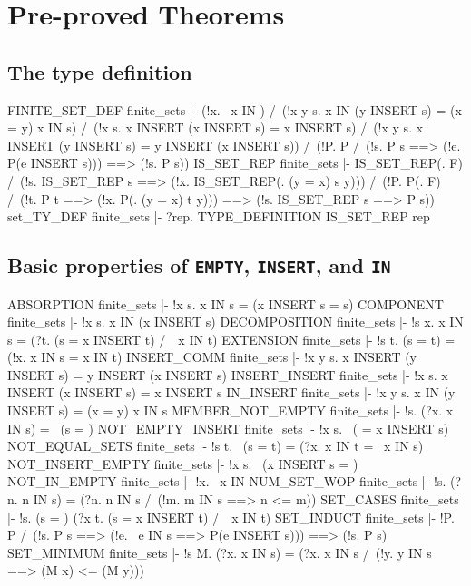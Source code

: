 \chapter{Pre-proved Theorems}

\section{The type definition}
\THEOREM FINITE\_SET\_DEF finite\_sets
|- (!x. ~x IN {}) /\
   (!x y s. x IN (y INSERT s) = (x = y) \/ x IN s) /\
   (!x s. x INSERT (x INSERT s) = x INSERT s) /\
   (!x y s. x INSERT (y INSERT s) = y INSERT (x INSERT s)) /\
   (!P. P{} /\ (!s. P s ==> (!e. P(e INSERT s))) ==> (!s. P s))
\ENDTHEOREM
\THEOREM IS\_SET\_REP finite\_sets
|- IS_SET_REP(\x. F) /\
   (!s. IS_SET_REP s ==> (!x. IS_SET_REP(\y. (y = x) \/ s y))) /\
   (!P.
     P(\x. F) /\ (!t. P t ==> (!x. P(\y. (y = x) \/ t y))) ==>
     (!s. IS_SET_REP s ==> P s))
\ENDTHEOREM
\THEOREM set\_TY\_DEF finite\_sets
|- ?rep. TYPE_DEFINITION IS_SET_REP rep
\ENDTHEOREM
\section{Basic properties of {\tt EMPTY}, {\tt INSERT}, and {\tt IN}}
\THEOREM ABSORPTION finite\_sets
|- !x s. x IN s = (x INSERT s = s)
\ENDTHEOREM
\THEOREM COMPONENT finite\_sets
|- !x s. x IN (x INSERT s)
\ENDTHEOREM
\THEOREM DECOMPOSITION finite\_sets
|- !s x. x IN s = (?t. (s = x INSERT t) /\ ~x IN t)
\ENDTHEOREM
\THEOREM EXTENSION finite\_sets
|- !s t. (s = t) = (!x. x IN s = x IN t)
\ENDTHEOREM
\THEOREM INSERT\_COMM finite\_sets
|- !x y s. x INSERT (y INSERT s) = y INSERT (x INSERT s)
\ENDTHEOREM
\THEOREM INSERT\_INSERT finite\_sets
|- !x s. x INSERT (x INSERT s) = x INSERT s
\ENDTHEOREM
\THEOREM IN\_INSERT finite\_sets
|- !x y s. x IN (y INSERT s) = (x = y) \/ x IN s
\ENDTHEOREM
\THEOREM MEMBER\_NOT\_EMPTY finite\_sets
|- !s. (?x. x IN s) = ~(s = {})
\ENDTHEOREM
\THEOREM NOT\_EMPTY\_INSERT finite\_sets
|- !x s. ~({} = x INSERT s)
\ENDTHEOREM
\THEOREM NOT\_EQUAL\_SETS finite\_sets
|- !s t. ~(s = t) = (?x. x IN t = ~x IN s)
\ENDTHEOREM
\THEOREM NOT\_INSERT\_EMPTY finite\_sets
|- !x s. ~(x INSERT s = {})
\ENDTHEOREM
\THEOREM NOT\_IN\_EMPTY finite\_sets
|- !x. ~x IN {}
\ENDTHEOREM
\THEOREM NUM\_SET\_WOP finite\_sets
|- !s. (?n. n IN s) = (?n. n IN s /\ (!m. m IN s ==> n <= m))
\ENDTHEOREM
\THEOREM SET\_CASES finite\_sets
|- !s. (s = {}) \/ (?x t. (s = x INSERT t) /\ ~x IN t)
\ENDTHEOREM
\THEOREM SET\_INDUCT finite\_sets
|- !P.
    P{} /\ (!s. P s ==> (!e. ~e IN s ==> P(e INSERT s))) ==> (!s. P s)
\ENDTHEOREM
\THEOREM SET\_MINIMUM finite\_sets
|- !s M. (?x. x IN s) = (?x. x IN s /\ (!y. y IN s ==> (M x) <= (M y)))
\ENDTHEOREM
